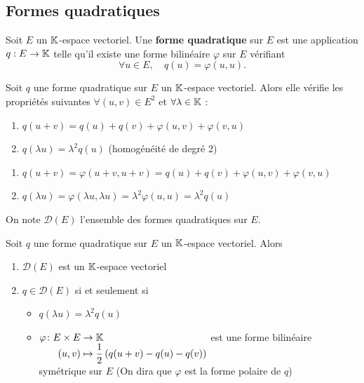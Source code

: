 \documentclass[a4paper, 12pt]{article}
\begin{document}
\subsection{Formes quadratiques}

\begin{definition}
    Soit $E$ un $\mathbb{K}$-espace vectoriel.
    Une \textbf{forme quadratique} sur $E$ est une application $q : E \to \mathbb{K}$ telle qu'il existe une forme bilinéaire $\varphi$ sur $E$ vérifiant
    $$
    \forall u \in E, \quad q(u) = \varphi(u, u).
    $$
\end{definition}

\begin{proposition}{}{}
    Soit $q$ une forme quadratique sur $E$ un $\mathbb{K}$-espace vectoriel.
    Alors elle vérifie les propriétés suivantes $\forall (u, v) \in E^2$ et $\forall \lambda \in \mathbb{K}$ :
    \begin{enumerate}
        \item $q(u + v) = q(u) + q(v) + \varphi(u, v) + \varphi(v, u)$
        \item $q(\lambda u) = \lambda^2 q(u)$ (homogénéité de degré 2)
    \end{enumerate}
\end{proposition}

\begin{demonstration}
    \begin{enumerate}
        \item $q(u + v) = \varphi(u + v, u + v) = q(u) + q(v) + \varphi(u, v) + \varphi(v, u)$
        \item $q(\lambda u) = \varphi(\lambda u, \lambda u) = \lambda^2 \varphi(u, u) = \lambda^2 q(u)$
    \end{enumerate}
\end{demonstration}

\begin{definition}
    On note $\mathcal{D}(E)$ l'ensemble des formes quadratiques sur $E$.
\end{definition}

\begin{proposition}{}{}
    Soit $q$ une forme quadratique sur $E$ un $\mathbb{K}$-espace vectoriel.
    Alors
    \begin{enumerate}
        \item $\mathcal{D}(E)$ est un $\mathbb{K}$-espace vectoriel
        \item $q \in \mathcal{D}(E)$ si et seulement si
        \begin{itemize}
            \item $q(\lambda u) = \lambda^2 q(u)$
            \item $\funcdef{\varphi}{E \times E}{\K}{(u, v)}{\dfrac{1}{2} \left( q(u + v) - q(u) - q(v) \right)}$ est une forme bilinéaire symétrique sur $E$
            (On dira que $\varphi$ est la forme polaire de $q$)
        \end{itemize}
    \end{enumerate}
\end{proposition}
\end{document}

